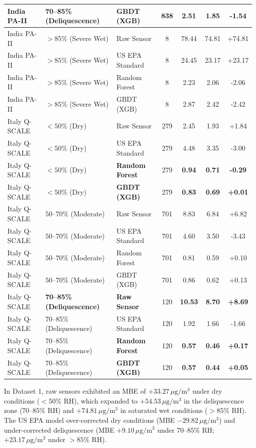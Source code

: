 \documentclass[11pt,a4paper]{article}
\begin{document}
\begin{table}[htbp]
\begin{tabularx}{\textwidth}{l l l c c c c}
India PA-II & 70--85\% (Deliquescence) & \textbf{GBDT (XGB)} & 838 & \textbf{2.51} & \textbf{1.85} & \textbf{-1.54} \\
\midrule
India PA-II & $>85\%$ (Severe Wet) & Raw Sensor & 8 & 78.44 & 74.81 & +74.81 \\
India PA-II & $>85\%$ (Severe Wet) & US EPA Standard & 8 & 24.45 & 23.17 & +23.17 \\
India PA-II & $>85\%$ (Severe Wet) & Random Forest & 8 & 2.23 & 2.06 & -2.06 \\
India PA-II & $>85\%$ (Severe Wet) & GBDT (XGB) & 8 & 2.87 & 2.42 & -2.42 \\
\midrule
Italy Q-SCALE & $<50\%$ (Dry) & Raw Sensor & 279 & 2.45 & 1.93 & +1.84 \\
Italy Q-SCALE & $<50\%$ (Dry) & US EPA Standard & 279 & 4.48 & 3.35 & -3.00 \\
Italy Q-SCALE & $<50\%$ (Dry) & \textbf{Random Forest} & 279 & \textbf{0.94} & \textbf{0.71} & \textbf{-0.29} \\
Italy Q-SCALE & $<50\%$ (Dry) & \textbf{GBDT (XGB)} & 279 & \textbf{0.83} & \textbf{0.69} & \textbf{+0.01} \\
\midrule
Italy Q-SCALE & $50\text{--}70\%$ (Moderate) & Raw Sensor & 701 & 8.83 & 6.84 & +6.82 \\
Italy Q-SCALE & $50\text{--}70\%$ (Moderate) & US EPA Standard & 701 & 4.60 & 3.50 & -3.43 \\
Italy Q-SCALE & $50\text{--}70\%$ (Moderate) & Random Forest & 701 & 0.81 & 0.59 & +0.10 \\
Italy Q-SCALE & $50\text{--}70\%$ (Moderate) & GBDT (XGB) & 701 & 0.86 & 0.62 & +0.13 \\
\midrule
Italy Q-SCALE & \textbf{70--85\% (Deliquescence)} & \textbf{Raw Sensor} & 120 & \textbf{10.53} & \textbf{8.70} & \textbf{+8.69} \\
Italy Q-SCALE & 70--85\% (Deliquescence) & US EPA Standard & 120 & 1.92 & 1.66 & -1.66 \\
Italy Q-SCALE & 70--85\% (Deliquescence) & \textbf{Random Forest} & 120 & \textbf{0.57} & \textbf{0.46} & \textbf{+0.17} \\
Italy Q-SCALE & 70--85\% (Deliquescence) & \textbf{GBDT (XGB)} & 120 & \textbf{0.57} & \textbf{0.44} & \textbf{+0.05} \\
\bottomrule
\end{tabularx}
\end{table}

In Dataset 1, raw sensors exhibited an MBE of $+33.27\,\mu\text{g}/\text{m}^3$ under dry conditions ($<50\%$ RH), which expanded to $+54.53\,\mu\text{g}/\text{m}^3$ in the deliquescence zone ($70\text{--}85\%$ RH) and $+74.81\,\mu\text{g}/\text{m}^3$ in saturated wet conditions ($>85\%$ RH). The US EPA model over-corrected dry conditions (MBE $-29.82\,\mu\text{g}/\text{m}^3$) and under-corrected deliquescence (MBE $+9.10\,\mu\text{g}/\text{m}^3$ under $70\text{--}85\%$ RH; $+23.17\,\mu\text{g}/\text{m}^3$ under $>85\%$ RH).
\end{document}
